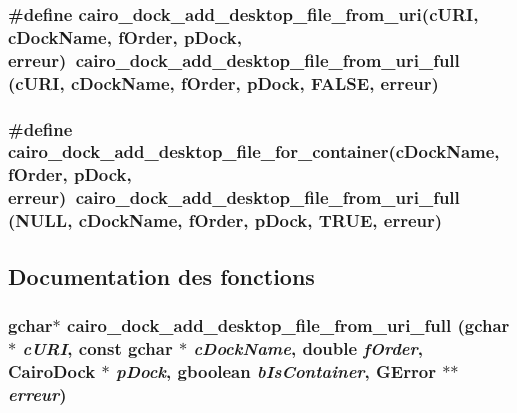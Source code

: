 \subsubsection{\setlength{\rightskip}{0pt plus 5cm}\#define cairo\_\-dock\_\-add\_\-desktop\_\-file\_\-from\_\-uri(cURI, cDockName, fOrder, pDock, erreur)~cairo\_\-dock\_\-add\_\-desktop\_\-file\_\-from\_\-uri\_\-full (cURI, cDockName, fOrder, pDock, FALSE, erreur)}\label{cairo-dock-desktop-file-factory_8h_4bebaf86198cc20a54e674e865c077f9}


\subsubsection{\setlength{\rightskip}{0pt plus 5cm}\#define cairo\_\-dock\_\-add\_\-desktop\_\-file\_\-for\_\-container(cDockName, fOrder, pDock, erreur)~cairo\_\-dock\_\-add\_\-desktop\_\-file\_\-from\_\-uri\_\-full (NULL, cDockName, fOrder, pDock, TRUE, erreur)}\label{cairo-dock-desktop-file-factory_8h_2001a580c2287b91127e224ae8e66f89}




\subsection{Documentation des fonctions}
\subsubsection{\setlength{\rightskip}{0pt plus 5cm}gchar$\ast$ cairo\_\-dock\_\-add\_\-desktop\_\-file\_\-from\_\-uri\_\-full (gchar $\ast$ {\em cURI}, const gchar $\ast$ {\em cDockName}, double {\em fOrder}, {\bf CairoDock} $\ast$ {\em pDock}, gboolean {\em bIsContainer}, GError $\ast$$\ast$ {\em erreur})}\label{cairo-dock-desktop-file-factory_8h_6703ff5ccc8fc9f2ce3eaaaa5edde0b1}


